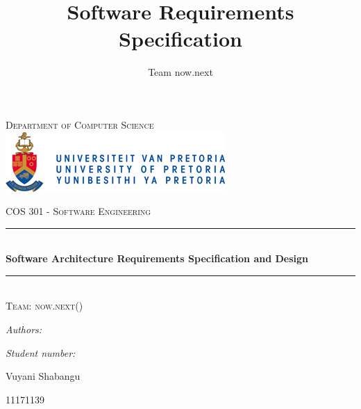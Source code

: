 \documentclass{article}
\author{Team now.next}
\title{ Software Requirements Specification}
\newcommand{\HRule}{\rule{\linewidth}{0.5mm}}
\begin{document}
	\setlength{\parskip}{6pt}
	
	\begin{titlepage}
		
		\begin{center}
			
			\textsc{\LARGE Department of Computer Science}\\[1.5cm]
			
			\includegraphics{images/up-logo}
			
			\textsc{\Large COS 301 - Software Engineering}\\[0.5cm]
			\HRule \\[0.4cm]
			{ \huge \bfseries Software Architecture Requirements Specification and Design}\\[0.4cm]
			\HRule \\[0.4cm]
			\textsc{\Large Team:  now.next()}\\[0.5cm]
			\begin{minipage}{0.4\textwidth}
				\begin{flushleft} \large
					\emph{Authors:}
				\end{flushleft}
			\end{minipage}
			\begin{minipage}{0.4\textwidth}
				\begin{flushright} \large
					\emph{Student number:}
				\end{flushright}
			\end{minipage}
			
			\begin{minipage}{0.4\textwidth}
				\begin{flushleft} \large
					Vuyani {Shabangu}
				\end{flushleft}
			\end{minipage}
			\begin{minipage}{0.4\textwidth}
				\begin{flushright} \large
					\emph{}
					11171139
				\end{flushright}
			\end{minipage}
			

\end{center}
\end{titlepage}
\end{document}

